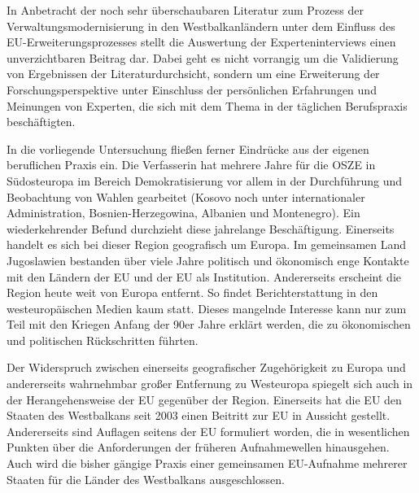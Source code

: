 In Anbetracht der noch sehr überschaubaren Literatur zum Prozess der Verwaltungsmodernisierung in den Westbalkanländern unter dem Einfluss des EU-Erweiterungsprozesses stellt die Auswertung der Experteninterviews einen unverzichtbaren Beitrag dar. Dabei geht es nicht vorrangig um die Validierung von Ergebnissen der Literaturdurchsicht, sondern um eine Erweiterung der Forschungsperspektive unter Einschluss der persönlichen Erfahrungen und Meinungen von Experten, die sich mit dem Thema in der täglichen Berufspraxis beschäftigten.\par
In die vorliegende Untersuchung fließen ferner Eindrücke aus der eigenen beruflichen Praxis ein. Die Verfasserin hat mehrere Jahre für die OSZE in Südosteuropa im Bereich Demokratisierung vor allem in der Durchführung und Beobachtung von Wahlen gearbeitet (Kosovo noch unter internationaler Administration, Bosnien-Herzegowina, Albanien und Montenegro). Ein wiederkehrender Befund durchzieht diese jahrelange Beschäftigung. Einerseits handelt es sich bei dieser Region geografisch um Europa. Im gemeinsamen Land Jugoslawien bestanden über viele Jahre politisch und ökonomisch enge Kontakte mit den Ländern der EU und der EU als Institution. Andererseits erscheint die Region heute weit von Europa entfernt. So findet Berichterstattung in den westeuropäischen Medien kaum statt. Dieses mangelnde Interesse kann nur zum Teil mit den Kriegen Anfang der 90er Jahre erklärt werden, die zu ökonomischen und politischen Rückschritten führten.\par
Der Widerspruch zwischen einerseits geografischer Zugehörigkeit zu Europa und andererseits wahrnehmbar großer Entfernung zu Westeuropa spiegelt sich auch in der Herangehensweise der EU gegenüber der Region. Einerseits hat die EU den Staaten des Westbalkans seit 2003 einen Beitritt zur EU in Aussicht gestellt. Andererseits sind Auflagen seitens der EU formuliert worden, die in wesentlichen Punkten über die Anforderungen der früheren Aufnahmewellen hinausgehen. Auch wird die bisher gängige Praxis einer gemeinsamen EU-Aufnahme mehrerer Staaten für die Länder des Westbalkans ausgeschlossen.
